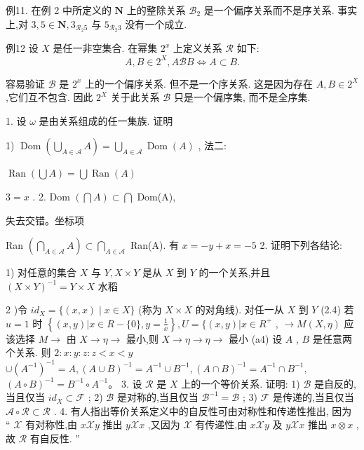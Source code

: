 例11. 在例 2 中所定义的 $\mathbf{N}$ 上的整除关系 ${\mathcal{B}}_{2}$ 是一个偏序关系而不是序关系. 事实上,对 $3,5 \in  \mathbf{N},{3}_{{\mathcal{R}}_{2}5}$ 与 ${5}_{{\mathcal{R}}_{2}3}$ 没有一个成立.

例12 设 $X$ 是任一非空集合. 在幂集 ${2}^{x}$ 上定义关系 $\mathcal{R}$ 如下:
$$A,B \in  {2}^{X},A\mathcal{B}B \Leftrightarrow  A \subset  B.$$

容易验证 $\mathcal{B}$ 是 ${2}^{x}$ 上的一个偏序关系. 但不是一个序关系. 这是因为存在 $A,B \in  {2}^{X}$ ,它们互不包含. 因此 ${2}^{X}$ 关于此关系 $\mathcal{B}$ 只是一个偏序集, 而不是全序集.

1. 设 $\omega$ 是由关系组成的任一集族. 证明

1) $\operatorname{Dom}\left( {\mathop{\bigcup }\limits_{{A \in  \mathcal{A}}}A}\right)  = \mathop{\bigcup }\limits_{{A \in  \mathcal{A}}}\operatorname{Dom}\left( A\right)$ , 法二:

$\operatorname{Ran}\left( {\bigcup A}\right)  = \bigcup \operatorname{Ran}\left( A\right)$

$3 = x$ . 2. Dom $\left( {\bigcap A}\right)  \subset  \bigcap$ Dom(A),

失去交错。坐标项

Ran $\left( {\mathop{\bigcap }\limits_{{A \in  \mathcal{A}}}A}\right)  \subset  \mathop{\bigcap }\limits_{{A \in  \mathcal{A}}}$ Ran(A). 有 $x =  - y + x =  - 5$ 2. 证明下列各结论:

1) 对任意的集合 $X$ 与 $Y,X \times  Y$ 是从 $X$ 到 $Y$ 的一个关系,并且 ${\left( X \times  Y\right) }^{-1} = Y \times  X$ 水稻

2 )令 $i{d}_{X} = \{ \left( {x,x}\right)  \mid  x \in  X\}$ (称为 $X \times  X$ 的对角线). 对任一从 $X$ 到 $Y$ (2.4) 若 $u = 1$ 时 $\left\{  {\left( {x,y}\right) |x \in  R-\{ 0\} ,y = \frac{1}{x}}\right\}  ,U = \{ \left( {x,y}\right) |x \in  {R}^{ + }$ , $\rightarrow  M\left( {X,\eta }\right)$ 应该选择 $M \rightarrow$ 由 $X \rightarrow  \eta  \rightarrow$ 最小,则 $X \rightarrow  \eta  \rightarrow  \eta  \rightarrow$ 最小 (a4) 设 $A$ , $B$ 是任意两个关系. 则 $2 : x : y : z : z < x < y$  $\cup  {\left( {A}^{-1}\right) }^{-1} = A,{\left( A \cup  B\right) }^{-1} = {A}^{-1} \cup  {B}^{-1},{\left( A \cap  B\right) }^{-1} = {A}^{-1} \cap  {B}^{-1},$  ${\left( A \circ  B\right) }^{-1} = {B}^{-1} \circ  {A}^{-1}。$ 3. 设 $\mathcal{R}$ 是 $X$ 上的一个等价关系. 证明: 1) $\mathcal{B}$ 是自反的,当且仅当 $i{d}_{X} \subset  \mathcal{F}$ ; 2) $\mathcal{B}$ 是对称的,当且仅当 ${\mathcal{B}}^{-1} = \mathcal{B}$ ; 3) $\mathcal{F}$ 是传递的,当且仅当 $\mathcal{A} \circ  \mathcal{R} \subset  \mathcal{R}$ . 4. 有人指出等价关系定义中的自反性可由对称性和传递性推出, 因为 “ $\mathcal{X}$ 有对称性,由 $x\mathcal{X}y$ 推出 $y\mathcal{X}x$ ,又因为 $\mathcal{X}$ 有传递性,由 $x\mathcal{X}y$ 及 $y\mathcal{X}x$ 推出 $x \otimes  x$ ,故 $\mathcal{R}$ 有自反性. ”

